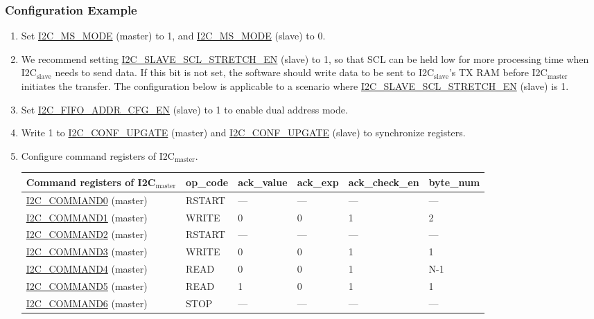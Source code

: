 \documentclass[main\_\_EN.tex]{subfiles}
\begin{document}
\subsubsection{Configuration Example}
\begin{enumerate}
\item Set \hyperref[fielddesc:I2CMSMODE]{I2C\_MS\_MODE} (master) to 1, and \hyperref[fielddesc:I2CMSMODE]{I2C\_MS\_MODE} (slave) to 0.
\item We recommend setting \hyperref[fielddesc:I2CSLAVESCLSTRETCHEN]{I2C\_SLAVE\_SCL\_STRETCH\_EN} (slave) to 1, so that SCL can be held low for more processing time when I2C$_\text{slave}$ needs to send data. If this bit is not set, the software should write data to be sent to I2C$_\text{slave}$'s TX RAM before I2C$_\text{master}$ initiates the transfer. The configuration below is applicable to a scenario where \hyperref[fielddesc:I2CSLAVESCLSTRETCHEN]{I2C\_SLAVE\_SCL\_STRETCH\_EN} (slave) is 1. 
\item Set \hyperref[fielddesc:I2CFIFOADDRCFGEN]{I2C\_FIFO\_ADDR\_CFG\_EN} (slave) to 1 to enable dual address mode.
\item Write 1 to \hyperref[fielddesc:I2CCONFUPGATE]{I2C\_CONF\_UPGATE} (master) and \hyperref[fielddesc:I2CCONFUPGATE]{I2C\_CONF\_UPGATE} (slave) to synchronize registers.
\item Configure command registers of I2C$_\text{master}$.
\begin{longtable}{ | p{5cm} | p{1.5cm} | p{1.5cm} | p{1.5cm} |p{2.5cm} | p{1.5cm}|}
\hline\rowcolor{lightgray}
Command registers of I2C$_\text{master}$& op\_code & ack\_value&ack\_exp&ack\_check\_en&byte\_num  \\ \hline
\hyperref[fielddesc:I2CCOMMAND0]{I2C\_COMMAND0} (master)& RSTART& ---&---&---&---  \\ \hline
\hyperref[fielddesc:I2CCOMMAND1]{I2C\_COMMAND1} (master)& WRITE& 0&0&1&2  \\ \hline
\hyperref[fielddesc:I2CCOMMAND2]{I2C\_COMMAND2} (master)& RSTART& ---&---&---&---  \\ \hline
\hyperref[fielddesc:I2CCOMMAND3]{I2C\_COMMAND3} (master)& WRITE& 0&0&1&1  \\ \hline
\hyperref[fielddesc:I2CCOMMAND4]{I2C\_COMMAND4} (master)& READ& 0&0&1&N-1  \\ \hline
\hyperref[fielddesc:I2CCOMMAND5]{I2C\_COMMAND5} (master)& READ& 1&0&1&1  \\ \hline
\hyperref[fielddesc:I2CCOMMAND6]{I2C\_COMMAND6} (master)& STOP& ---&---&---&---  \\ \hline
\end{longtable}


\end{enumerate}
\end{document}
